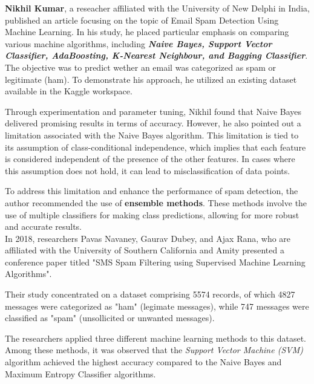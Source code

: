 \documentclass[12pt,a4paper]{report}
\begin{document}
	
	\cite{crawford2015survey} \textbf{Nikhil Kumar}, a reseacher affiliated with the University of New Delphi in India, published an article focusing on the topic of Email Spam Detection Using Machine Learning. In his study, he placed particular emphasis on comparing various machine algorithms, including \textbf{\textit{Naive Bayes, Support Vector Classifier, AdaBoosting, K-Nearest Neighbour, and Bagging Classifier}}. The objective was to predict wether an email was categorized as spam or legitimate (ham). To demonstrate his approach, he utilized an existing dataset available in the Kaggle workspace.
	
	Through experimentation and parameter tuning, Nikhil found that Naive Bayes delivered promising results in terms of accuracy. However, he also pointed out a limitation associated with the Naive Bayes algorithm. This limitation is tied to its assumption of class-conditional independence, which implies that each feature is considered independent of the presence of the other features. In cases where this assumption does not hold, it can lead to misclassification of data points.
	
	To address this limitation and enhance the performance of spam detection, the author recommended the use of \textbf{ensemble methods}. These methods involve the use of multiple classifiers for making class predictions, allowing for more robust and accurate results.\\
		
	\cite{navaney2018sms} In 2018, researchers Pavas Navaney, Gaurav Dubey, and Ajax Rana, who are affiliated with the University of Southern California and Amity presented a conference paper titled "SMS Spam Filtering using Supervised Machine Learning Algorithms".
	
	Their study concentrated on a dataset comprising 5574 records, of which 4827 messages were categorized as "ham" (legimate messages), while 747 messages were classified as "spam" (unsollicited or unwanted messages).
	
	The researchers applied three different machine learning methods to this dataset. Among these methods, it was observed that the \textit{Support Vector Machine (SVM)} algorithm achieved the highest accuracy compared to the Naive Bayes and Maximum Entropy Classifier algorithms. \\
	
\end{document}
